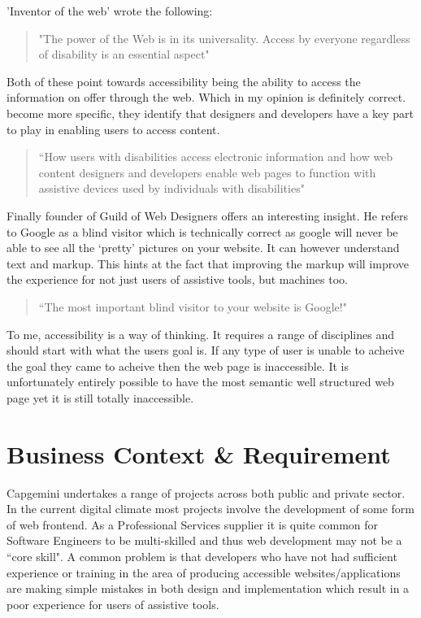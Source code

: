 \cite*{TimBerners} 'Inventor of the web' wrote the following:
\begin{quote}
"The power of the Web is in its universality. Access by everyone regardless
of disability is an essential aspect"
\end{quote}

Both of these point towards accessibility being the ability to access the
information on offer through the web. Which in my opinion is definitely
correct. \cite*{Adobe} become more specific, they identify that
designers and
developers have a key part to play in enabling users to access content.

\begin{quote}
``How users with disabilities access electronic information and how web content
designers and developers enable web pages to function with assistive devices
used by individuals with disabilities"
\end{quote}

Finally \cite*{JimByrne} founder of Guild of Web Designers offers an interesting
insight. He refers to Google as a blind visitor which is technically correct
as google will never be able to see all the `pretty' pictures on your website.
It can however understand text and markup. This hints at the fact that
improving the markup will improve the experience for not just users of
assistive tools, but machines too.

\begin{quote}
``The most important blind visitor to your website is Google!"
\end{quote}

To me, accessibility is a way of thinking. It requires a range of disciplines
and should start with what the users goal is. If any type of user is unable to
acheive the goal they came to acheive then the web page is inaccessible. It
is unfortunately entirely possible to have the most semantic well
structured web page yet it is still totally inaccessible.

\section{Business Context \& Requirement}
Capgemini undertakes a range of projects across both public and private
sector. In the current digital climate most projects involve the
development of some form of web frontend. As a Professional Services supplier it
is quite common for Software Engineers to be multi-skilled and thus web
development may not be a ``core skill". A common problem is that developers
who have not had sufficient experience or training in the area of producing
accessible websites/applications are making simple mistakes in both design and
implementation which result in a poor experience for users of assistive tools.

